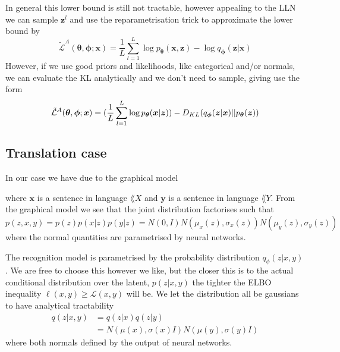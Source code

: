 In general this lower bound is still not tractable, however appealing to the LLN
we can sample $\bm{z}^{l}$ and use the reparametrisation trick to approximate
the lower bound by
\begin{equation}
  \label{eq:SGVB}
  \tilde{\mathcal{L}}^A(\bm{\theta}, \bm{\phi}; \bm{x}) = \frac{1}{L} \sum_{l = 1}^L \log p_{\bm{\theta}}(\bm{x}, \bm{z}) - \log q_{\bm{\phi}}(\bm{z} | \bm{x})
\end{equation}
However, if we use good priors and likelihoods, like categorical and/or normals,
we can evaluate the KL analytically and we don't need to sample, giving use the
form
\begin{equation}
  \label{eq:SGVB_analytical_KL}
  \tilde{\mathcal{L}}^A(\bm{\theta}, \bm{\phi}; \bm{x}) = (\frac{1}{L} \sum_{l = 1}^L \log p_{\bm{\theta}}(\bm{x} | \bm{z})) - D_{KL}(q_{\bm{\phi}}(\bm{z} | \bm{x}) || p_{\bm{\theta}}(\bm{z}))
\end{equation}

\subsection{Translation case}

In our case we have due to the graphical model

\begin{figure}[H]
  \center
\end{figure}

where $\bm{x}$ is a sentence in language $\lang{X}$ and $\bm{y}$ is a sentence in language $\lang{Y}$.
From the graphical model we see that the joint distribution factorises such that
\begin{equation}
  \label{eq:joint_generative}
  p(z, x, y) = p(z)p(x | z)p(y | z) = N(0, I)N(\mu_x(z), \sigma_x(z))N(\mu_y(z), \sigma_y(z))
\end{equation}
where the normal quantities are parametrised by neural networks.

The recognition model is parametrised by the probability distribution
$q_{\phi}(z | x, y)$. We are free to choose this however we like, but the closer
this is to the actual conditional distribution over the latent, $p(z | x, y)$
the tighter the ELBO inequality $\ell(x, y) \geq \mathcal{L}(x, y)$ will be. We
let the distribution all be gaussians to have analytical tractability
\begin{align*}
  q(z | x, y) & = q(z | x)q(z | y) \\
              & = N(\mu(x), \sigma(x) I) N(\mu(y), \sigma(y) I)
\end{align*}
where both normals defined by the output of neural networks.


